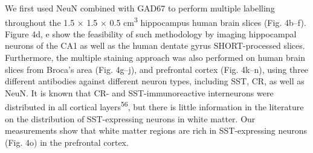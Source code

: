 \documentclass{article}
\begin{document}
We first used NeuN combined with GAD67 to perform multiple labelling throughout the 1.5 × 1.5 × 0.5 cm\textsuperscript{3} hippocampus human brain slices (Fig. 4b–f). Figure 4d, e show the feasibility of such methodology by imaging hippocampal neurons of the CA1 as well as the human dentate gyrus SHORT-processed slices. Furthermore, the multiple staining approach was also performed on human brain slices from Broca’s area (Fig. 4g–j), and prefrontal cortex (Fig. 4k–n), using three different antibodies against different neuron types, including SST, CR, as well as NeuN. It is known that CR- and SST-immunoreactive interneurons were distributed in all cortical layers\textsuperscript{56}, but there is little information in the literature on the distribution of SST-expressing neurons in white matter. Our measurements show that white matter regions are rich in SST-expressing neurons (Fig. 4o) in the prefrontal cortex.
\end{document}
